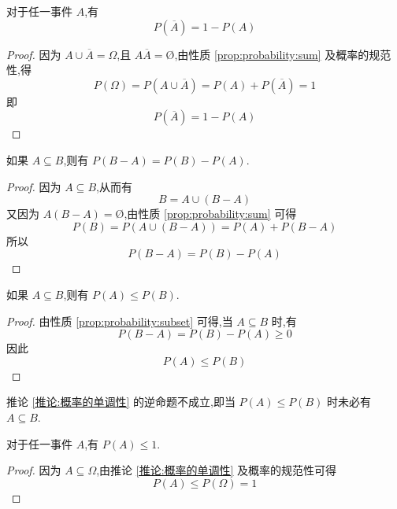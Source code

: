\begin{property}
    \indent 对于任一事件 $A$,有
    \begin{equation}
        P(\overline{A})=1-P(A)
    \end{equation}
\end{property}

\begin{proof}
    因为 $A \cup \overline{A} = \varOmega$,且 $A \overline{A} = \text{\O}$,由性质 \ref{prop:probability:sum} 及概率的规范性,得
    $$
    P(\varOmega) = P(A \cup \overline{A}) = P(A) + P(\overline{A}) = 1
    $$
    即
    \[
    P(\overline{A})=1-P(A)
    \]
\end{proof}

\begin{property}
    \indent 如果 $A \subseteq B$,则有 $P(B-A)=P(B)-P(A)$.
\end{property}

\begin{proof}
    因为 $A \subseteq B$,从而有
    $$
    B = A \cup (B-A)
    $$
    又因为 $A(B-A)=\text{\O}$,由性质 \ref{prop:probability:sum} 可得
    $$
    P(B) = P(A \cup (B-A)) = P(A) + P(B-A)
    $$
    所以
    $$
    P(B-A)=P(B)-P(A)
    $$
\end{proof}

\begin{corollary}[][概率的单调性][推论:概率的单调性]
    \indent 如果 $A \subseteq B$,则有 $P(A) \leqslant P(B)$.
\end{corollary}

\begin{proof}
    由性质 \ref{prop:probability:subset} 可得,当 $A \subseteq B$ 时,有
    $$
    P(B-A) = P(B)-P(A) \geqslant 0
    $$
    因此
    $$
    P(A) \leqslant P(B)
    $$
\end{proof}

\begin{note}
    \indent 推论 \ref{推论:概率的单调性} 的逆命题不成立,即当 $P(A) \leqslant P(B)$ 时未必有 $A \subseteq B$.
\end{note}

\begin{property}[][][prop:probability:<=1]
    \indent 对于任一事件 $A$,有 $P(A) \leqslant 1$.
\end{property}

\begin{proof}
    因为 $A \subseteq \varOmega$,由推论 \ref{推论:概率的单调性} 及概率的规范性可得
    \[
    P(A) \leqslant P(\varOmega) = 1
    \]
\end{proof}

